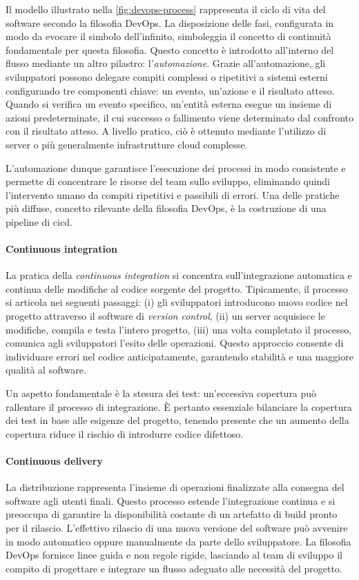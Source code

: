 Il modello illustrato nella \cref{fig:devops-process} rappresenta il ciclo di vita del software secondo la filosofia DevOps. La disposizione delle fasi, configurata in modo da evocare il simbolo dell'infinito, simboleggia il concetto di continuità fondamentale per questa filosofia. Questo concetto è introdotto all'interno del flusso mediante un altro pilastro: l'\textit{automazione}. Grazie all'automazione, gli sviluppatori possono delegare compiti complessi o ripetitivi a sistemi esterni configurando tre componenti chiave: un evento, un'azione e il risultato atteso. Quando si verifica un evento specifico, un'entità esterna esegue un insieme di azioni predeterminate, il cui successo o fallimento viene determinato dal confronto con il risultato atteso. A livello pratico, ciò è ottenuto mediante l'utilizzo di server o più generalmente infrastrutture cloud complesse.

L'automazione dunque garantisce l'esecuzione dei processi in modo consistente e permette di concentrare le risorse del team sullo sviluppo, eliminando quindi l'intervento umano da compiti ripetitivi e passibili di errori. Una delle pratiche più diffuse, concetto rilevante della filosofia DevOps, è la costruzione di una pipeline di \ac{cicd}.

\paragraph{Continuous integration} La pratica della \textit{continuous integration} si concentra sull'integrazione automatica e continua delle modifiche al codice sorgente del progetto. Tipicamente, il processo si articola nei seguenti passaggi: (i) gli sviluppatori introducono nuovo codice nel progetto attraverso il software di \textit{version control}, (ii) un server acquisisce le modifiche, compila e testa l'intero progetto, (iii) una volta completato il processo, comunica agli sviluppatori l'esito delle operazioni. Questo approccio consente di individuare errori nel codice anticipatamente, garantendo stabilità e una maggiore qualità al software.

Un aspetto fondamentale è la stesura dei test: un'eccessiva copertura può rallentare il processo di integrazione. È pertanto essenziale bilanciare la copertura dei test in base alle esigenze del progetto, tenendo presente che un aumento della copertura riduce il rischio di introdurre codice difettoso.

\paragraph{Continuous delivery} La distribuzione rappresenta l'insieme di operazioni finalizzate alla consegna del software agli utenti finali. Questo processo estende l'integrazione continua e si preoccupa di garantire la disponibilità costante di un artefatto di build pronto per il rilascio. L'effettivo rilascio di una nuova versione del software può avvenire in modo automatico oppure manualmente da parte dello sviluppatore. La filosofia DevOps fornisce linee guida e non regole rigide, lasciando al team di sviluppo il compito di progettare e integrare un flusso adeguato alle necessità del progetto.

